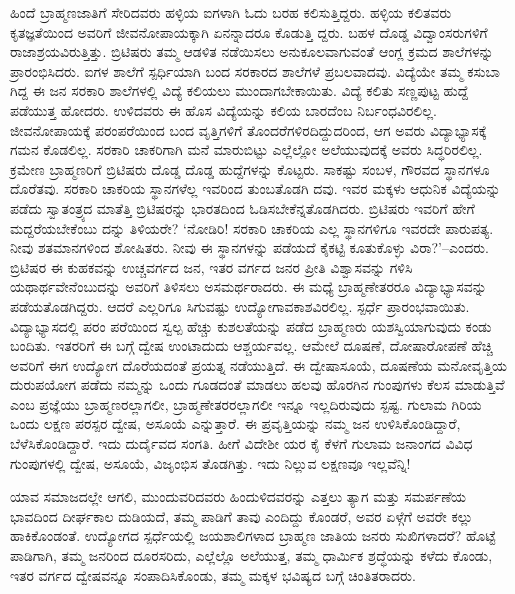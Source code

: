 ಹಿಂದೆ ಬ್ರಾಹ್ಮಣಜಾತಿಗೆ ಸೇರಿದವರು ಹಳ್ಳಿಯ ಐಗಳಾಗಿ ಓದು ಬರಹ ಕಲಿಸುತ್ತಿದ್ದರು. ಹಳ್ಳಿಯ ಕಲಿತವರು ಕೃತಜ್ಞತೆಯಿಂದ ಅವರಿಗೆ ಜೀವನೋಪಾಯಕ್ಕಾಗಿ ಏನನ್ನಾದರೂ ಕೊಡುತ್ತಿ ದ್ದರು. ಬಹಳ ದೊಡ್ಡ ವಿದ್ವಾಂಸರುಗಳಿಗೆ ರಾಜಾಶ್ರಯವಿರುತ್ತಿತ್ತು. ಬ್ರಿಟಿಷರು ತಮ್ಮ ಆಡಳಿತ ನಡೆಯಿಸಲು ಅನುಕೂಲವಾಗುವಂತೆ ಆಂಗ್ಲ ಕ್ರಮದ ಶಾಲೆಗಳನ್ನು ಪ್ರಾರಂಭಿಸಿದರು. ಐಗಳ ಶಾಲೆಗೆ ಸ್ಪರ್ಧಿಯಾಗಿ ಬಂದ ಸರಕಾರದ ಶಾಲೆಗಳೆ ಪ್ರಬಲವಾದವು. ವಿದ್ಯೆಯೇ ತಮ್ಮ ಕಸುಬಾ ಗಿದ್ದ ಈ ಜನ ಸರಕಾರಿ ಶಾಲೆಗಳಲ್ಲಿ ವಿದ್ಯೆ ಕಲಿಯಲು ಮುಂದಾಗಬೇಕಾಯಿತು. ವಿದ್ಯೆ ಕಲಿತು ಸಣ್ಣಪುಟ್ಟ ಹುದ್ದೆ ಪಡೆಯುತ್ತ ಹೋದರು. ಉಳಿದವರು ಈ ಹೊಸ ವಿದ್ಯೆಯನ್ನು ಕಲಿಯ ಬಾರದೆಂಬ ನಿರ್ಬಂಧವಿರಲಿಲ್ಲ. ಜೀವನೋಪಾಯಕ್ಕೆ ಪರಂಪರೆಯಿಂದ ಬಂದ ವೃತ್ತಿಗಳಿಗೆ ತೊಂದರೆಗಳಿರದಿದ್ದುದರಿಂದ, ಆಗ ಅವರು ವಿದ್ಯಾಭ್ಯಾಸಕ್ಕೆ ಗಮನ ಕೊಡಲಿಲ್ಲ. ಸರಕಾರಿ ಚಾಕರಿಗಾಗಿ ಮನೆ ಮಾರುಬಿಟ್ಟು ಎಲ್ಲೆಲ್ಲೋ ಅಲೆಯುವುದಕ್ಕೆ ಅವರು ಸಿದ್ಧರಿರಲಿಲ್ಲ. ಕ್ರಮೇಣ ಬ್ರಾಹ್ಮಣರಿಗೆ ಬ್ರಿಟಿಷರು ದೊಡ್ಡ ದೊಡ್ಡ ಹುದ್ದೆಗಳನ್ನು ಕೊಟ್ಟರು. ಸಾಕಷ್ಟು ಸಂಬಳ, ಗೌರವದ ಸ್ಥಾನಗಳೂ ದೊರೆತವು. ಸರಕಾರಿ ಚಾಕರಿಯ ಸ್ಥಾನಗಳೆಲ್ಲ ಇವರಿಂದ ತುಂಬತೊಡಗಿ ದವು. ಇವರ ಮಕ್ಕಳು ಆಧುನಿಕ ವಿದ್ಯೆಯನ್ನು ಪಡೆದು ಸ್ವಾತಂತ್ರ್ಯದ ಮಾತೆತ್ತಿ ಬ್ರಿಟಿಷರನ್ನು ಭಾರತದಿಂದ ಓಡಿಸಬೇಕೆನ್ನತೊಡಗಿದರು. ಬ್ರಿಟಿಷರು ಇವರಿಗೆ ಹೇಗೆ ಮದ್ದರೆಯಬೇಕೆಂಬು ದನ್ನು ತಿಳಿಯರೇ? ‘ನೋಡಿರಿ! ಸರಕಾರಿ ಚಾಕರಿಯ ಎಲ್ಲ ಸ್ಥಾನಗಳಿಗೂ ಇವರದೇ ಪಾರುಪತ್ಯ. ನೀವು ಶತಮಾನಗಳಿಂದ ಶೋಷಿತರು. ನೀವು ಈ ಸ್ಥಾನಗಳನ್ನು ಪಡೆಯದೆ ಕೈಕಟ್ಟಿ ಕೂತುಕೊಳ್ಳು ವಿರಾ?’–ಎಂದರು. ಬ್ರಿಟಿಷರ ಈ ಕುಹಕವನ್ನು ಉಚ್ಚವರ್ಗದ ಜನ, ಇತರ ವರ್ಗದ ಜನರ ಪ್ರೀತಿ ವಿಶ್ವಾಸವನ್ನು ಗಳಿಸಿ ಯಥಾರ್ಥವೇನೆಂಬುದನ್ನು ಅವರಿಗೆ ತಿಳಿಸಲು ಅಸಮರ್ಥರಾದರು. ಈ ಮಧ್ಯೆ ಬ್ರಾಹ್ಮಣೇತರರೂ ವಿದ್ಯಾಭ್ಯಾಸವನ್ನು ಪಡೆಯತೊಡಗಿದ್ದರು. ಆದರೆ ಎಲ್ಲರಿಗೂ ಸಿಗುವಷ್ಟು ಉದ್ಯೋಗಾವಕಾಶವಿರಲಿಲ್ಲ. ಸ್ಪರ್ಧೆ ಪ್ರಾರಂಭವಾಯಿತು. ವಿದ್ಯಾಭ್ಯಾಸದಲ್ಲಿ ಪರಂ ಪರೆಯಿಂದ ಸ್ವಲ್ಪ ಹೆಚ್ಚು ಕುಶಲತೆಯನ್ನು ಪಡೆದ ಬ್ರಾಹ್ಮಣರು ಯಶಸ್ವಿಯಾಗುವುದು ಕಂಡು ಬಂದಿತು. ಇತರರಿಗೆ ಈ ಬಗ್ಗೆ ದ್ವೇಷ ಉಂಟಾದುದು ಆಶ್ಚರ್ಯವಲ್ಲ. ಆಮೇಲೆ ದೂಷಣೆ, ದೋಷಾರೋಪಣೆ ಹೆಚ್ಚಿ ಅವರಿಗೆ ಈಗ ಉದ್ಯೋಗ ದೊರೆಯದಂತೆ ಪ್ರಯತ್ನ ನಡೆಯುತ್ತಿದೆ. ಈ ದ್ವೇಷಾಸೂಯೆ, ದೂಷಣೆಯ ಮನೋವೃತ್ತಿಯ ದುರುಪಯೋಗ ಪಡೆದು ನಮ್ಮನ್ನು ಒಂದು ಗೂಡದಂತೆ ಮಾಡಲು ಹಲವು ಹೊರಗಿನ ಗುಂಪುಗಳು ಕೆಲಸ ಮಾಡುತ್ತಿವೆ ಎಂಬ ಪ್ರಜ್ಞೆಯು ಬ್ರಾಹ್ಮಣರಲ್ಲಾಗಲೀ, ಬ್ರಾಹ್ಮಣೇತರರಲ್ಲಾಗಲೀ ಇನ್ನೂ ಇಲ್ಲದಿರುವುದು ಸ್ಪಷ್ಟ. ಗುಲಾಮ ಗಿರಿಯ ಒಂದು ಲಕ್ಷಣ ಪರಸ್ಪರ ದ್ವೇಷ, ಅಸೂಯೆ ಎನ್ನುತ್ತಾರೆ. ಈ ಪ್ರವೃತ್ತಿಯನ್ನು ನಮ್ಮ ಜನ ಉಳಿಸಿಕೊಂಡಿದ್ದಾರೆ, ಬೆಳೆಸಿಕೊಂಡಿದ್ದಾರೆ. ಇದು ದುರ್ದೈವದ ಸಂಗತಿ. ಹೀಗೆ ವಿದೇಶೀ ಯರ ಕೈ ಕೆಳಗೆ ಗುಲಾಮ ಜನಾಂಗದ ವಿವಿಧ ಗುಂಪುಗಳಲ್ಲಿ ದ್ವೇಷ, ಅಸೂಯೆ, ವಿಜೃಂಭಿಸ ತೊಡಗಿತ್ತು. ಇದು ನಿಲ್ಲುವ ಲಕ್ಷಣವೂ ಇಲ್ಲವೆನ್ನಿ!

ಯಾವ ಸಮಾಜದಲ್ಲೇ ಆಗಲಿ, ಮುಂದುವರಿದವರು ಹಿಂದುಳಿದವರನ್ನು ಎತ್ತಲು ತ್ಯಾಗ ಮತ್ತು ಸಮರ್ಪಣೆಯ ಭಾವದಿಂದ ದೀರ್ಘಕಾಲ ದುಡಿಯದೆ, ತಮ್ಮ ಪಾಡಿಗೆ ತಾವು ಎಂದಿದ್ದು ಕೊಂಡರೆ, ಅವರ ಏಳ್ಗೆಗೆ ಅವರೇ ಕಲ್ಲು ಹಾಕಿಕೊಂಡಂತೆ. ಉದ್ಯೋಗದ ಸ್ಪರ್ಧೆಯಲ್ಲಿ ಜಯಶಾಲಿಗಳಾದ ಬ್ರಾಹ್ಮಣ ಜಾತಿಯ ಜನರು ಸುಖಿಗಳಾದರೆ? ಹೊಟ್ಟೆ ಪಾಡಿಗಾಗಿ, ತಮ್ಮ ಜನರಿಂದ ದೂರಸರಿದು, ಎಲ್ಲೆಲ್ಲೊ ಅಲೆಯುತ್ತ, ತಮ್ಮ ಧಾರ್ಮಿಕ ಶ್ರದ್ಧೆಯನ್ನು ಕಳೆದು ಕೊಂಡು, ಇತರ ವರ್ಗದ ದ್ವೇಷವನ್ನೂ ಸಂಪಾದಿಸಿಕೊಂಡು, ತಮ್ಮ ಮಕ್ಕಳ ಭವಿಷ್ಯದ ಬಗ್ಗೆ ಚಿಂತಿತರಾದರು.

